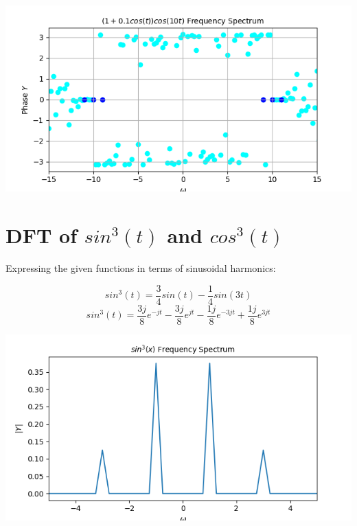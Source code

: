 \documentclass[12pt, a4paper]{report}
\begin{document}
\begin{center}
	\includegraphics[scale=0.72]{Figure_4.png} 
	\label{fig:rawdata}
\end{center}

\section*{DFT of $sin^3(t)$ and $cos^3(t)$}
Expressing the given functions in terms of sinusoidal harmonics:

\begin{equation*}
sin^3(t) = \frac{3}{4}sin(t) - \frac{1}{4}sin(3t)
\end{equation*}
\begin{equation*}
sin^3(t) = \frac{3j}{8}e^{-jt} - \frac{3j}{8}e^{jt} - \frac{1j}{8}e^{-3jt} + \frac{1j}{8}e^{3jt}
\end{equation*}
\clearpage
\begin{center}
	\includegraphics[scale=0.72]{Figure_5.png} 
	\label{fig:rawdata}
\end{center}
\end{document}
